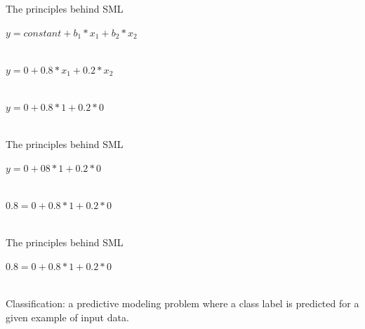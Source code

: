 \documentclass[handout]{beamer}
\begin{document}
\begin{frame}{The principles behind SML} 
	
	\(y = constant + b_1 * x_1 + b_2 * x_2\) \\\
	
	\(y = 0 + 0.8 * x_1 + 0.2 * x_2\) \\\
	
	\(y = 0 + 0.8 * 1 + 0.2 * 0\) \\\
	
	
\end{frame}

\begin{frame}{The principles behind SML} 
	
	\(y = 0 + 08 * 1 + 0.2 * 0\) \\\
	
	\(0.8 = 0 + 0.8 * 1 + 0.2 * 0\) \\\
	
	
\end{frame}

\begin{frame}{The principles behind SML} 
	
	\(0.8 = 0 + 0.8 * 1 + 0.2 * 0\) \\\
	
	Classification: a predictive modeling problem where a class label is predicted for a given example of input data. 
	
	
	
	
	
	
\end{frame}
\end{document}

